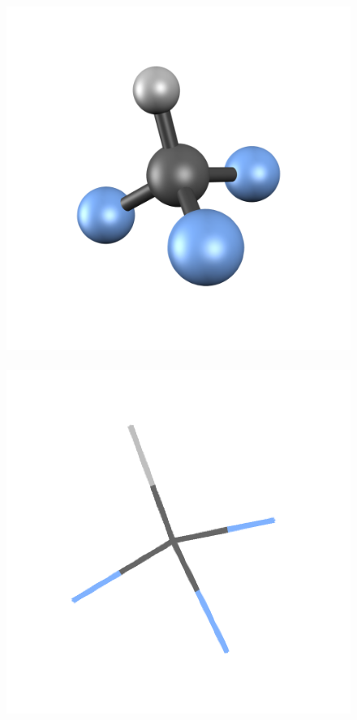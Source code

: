 \documentclass[a4paper,12pt]{article}
\begin{document}
\begin{figure}[h]
\begin{center}
\includegraphics[scale=0.18]{figures/CHF3-balls.png}\hspace{-3mm}~
\includegraphics[scale=0.20]{figures/CHF3-wire.png}\hspace{-3mm}~

\end{center}
\end{figure}
\end{document}
